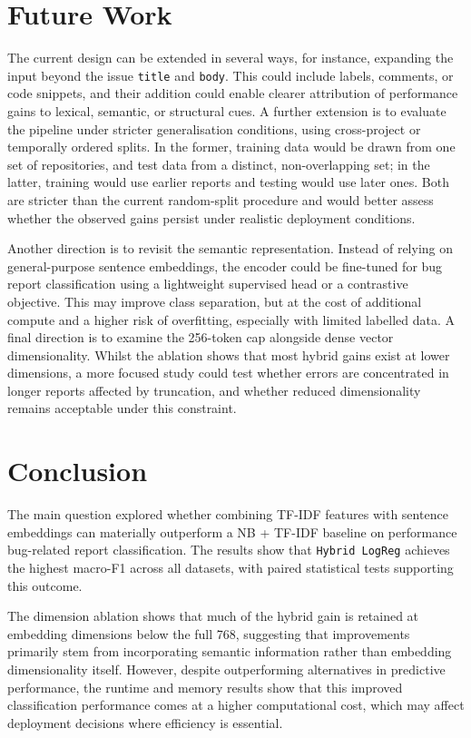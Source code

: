 \documentclass[10pt,a4paper]{article}
\begin{document}
\section{Future Work}

The current design can be extended in several ways, for instance, expanding the input beyond the issue \texttt{title} and \texttt{body}. This could include labels, comments, or code snippets, and their addition could enable clearer attribution of performance gains to lexical, semantic, or structural cues.
A further extension is to evaluate the pipeline under stricter generalisation conditions, using cross-project or temporally ordered splits. In the former, training data would be drawn from one set of repositories, and test data from a distinct, non-overlapping set; in the latter, training would use earlier reports and testing would use later ones. Both are stricter than the current random-split procedure and would better assess whether the observed gains persist under realistic deployment conditions.


Another direction is to revisit the semantic representation. Instead of relying on general-purpose sentence embeddings, the encoder could be fine-tuned for bug report classification using a lightweight supervised head or a contrastive objective. This may improve class separation, but at the cost of additional compute and a higher risk of overfitting, especially with limited labelled data.
A final direction is to examine the 256-token cap alongside dense vector dimensionality. Whilst the ablation shows that most hybrid gains exist at lower dimensions, a more focused study could test whether errors are concentrated in longer reports affected by truncation, and whether reduced dimensionality remains acceptable under this constraint.


\section{Conclusion}

The main question explored whether combining TF-IDF features with sentence embeddings can materially outperform a NB + TF-IDF baseline on performance bug-related report classification. The results show that \texttt{Hybrid LogReg} achieves the highest macro-F1 across all datasets, with paired statistical tests supporting this outcome.

The dimension ablation shows that much of the hybrid gain is retained at embedding dimensions below the full 768, suggesting that improvements primarily stem from incorporating semantic information rather than embedding dimensionality itself. However, despite outperforming alternatives in predictive performance, the runtime and memory results show that this improved classification performance comes at a higher computational cost, which may affect deployment decisions where efficiency is essential.
\end{document}
